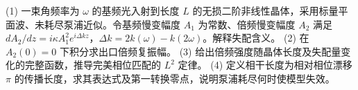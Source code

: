 (1) 一束角频率为 \(\omega\) 的基频光入射到长度 \(L\) 的无损二阶非线性晶体，采用标量平面波、未耗尽泵浦近似。令基频慢变幅度 \(A_1\) 为常数、倍频慢变幅度 \(A_2\) 满足 \(dA_2/dz=i\kappa A_1^2e^{i\Delta kz}\)，\(\Delta k=2k(\omega)-k(2\omega)\)。解释失配含义。
(2) 在 \(A_2(0)=0\) 下积分求出口倍频复振幅。
(3) 给出倍频强度随晶体长度及失配量变化的完整函数，推导完美相位匹配的 \(L^2\) 定律。
(4) 定义相干长度为相对相位漂移 \(\pi\) 的传播长度，求其表达式及第一转换零点，说明泵浦耗尽何时使模型失效。
